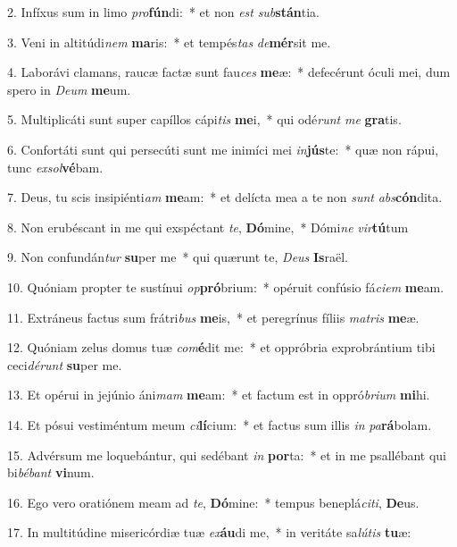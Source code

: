 2. Infíxus sum in limo \textit{pro}\textbf{fún}di:~*  et non \textit{est} \textit{sub}\textbf{stán}tia.\

3. Veni in altitúdi\textit{nem} \textbf{ma}ris:~*  et tempés\textit{tas} \textit{de}\textbf{mér}sit me.\

4. Laborávi clamans, raucæ factæ sunt fau\textit{ces} \textbf{me}æ:~*  defecérunt óculi mei, dum spero in \textit{De}\textit{um} \textbf{me}um.\

5. Multiplicáti sunt super capíllos cápi\textit{tis} \textbf{me}i,~*  qui odé\textit{runt} \textit{me} \textbf{gra}tis.\

6. Confortáti sunt qui persecúti sunt me inimíci mei \textit{in}\textbf{jús}te:~*  quæ non rápui, tunc \textit{ex}\textit{sol}\textbf{vé}bam.\

7. Deus, tu scis insipiénti\textit{am} \textbf{me}am:~*  et delícta mea a te non \textit{sunt} \textit{abs}\textbf{cón}dita.\

8. Non erubéscant in me qui exspéctant \textit{te}, \textbf{Dó}mine,~*  Dómi\textit{ne} \textit{vir}\textbf{tú}tum\

9. Non confundán\textit{tur} \textbf{su}per me~*  qui quærunt te, \textit{De}\textit{us} \textbf{Is}raël.\

10. Quóniam propter te sustínui \textit{op}\textbf{pró}brium:~*  opéruit confúsio fá\textit{ci}\textit{em} \textbf{me}am.\

11. Extráneus factus sum frátri\textit{bus} \textbf{me}is,~*  et peregrínus fíliis \textit{ma}\textit{tris} \textbf{me}æ.\

12. Quóniam zelus domus tuæ \textit{com}\textbf{é}dit me:~*  et oppróbria exprobrántium tibi ceci\textit{dé}\textit{runt} \textbf{su}per me.\

13. Et opérui in jejúnio áni\textit{mam} \textbf{me}am:~*  et factum est in oppró\textit{bri}\textit{um} \textbf{mi}hi.\

14. Et pósui vestiméntum meum \textit{ci}\textbf{lí}cium:~*  et factus sum illis \textit{in} \textit{pa}\textbf{rá}bolam.\

15. Advérsum me loquebántur, qui sedébant \textit{in} \textbf{por}ta:~*  et in me psallébant qui bi\textit{bé}\textit{bant} \textbf{vi}num.\

16. Ego vero oratiónem meam ad \textit{te}, \textbf{Dó}mine:~*  tempus beneplá\textit{ci}\textit{ti}, \textbf{De}us.\

17. In multitúdine misericórdiæ tuæ \textit{ex}\textbf{áu}di me,~*  in veritáte sa\textit{lú}\textit{tis} \textbf{tu}æ:\

